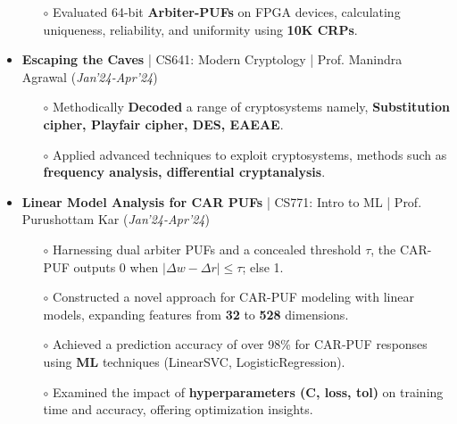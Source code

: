 \documentclass[10.8pt, a4paper]{extarticle}
\begin{document}
\begin{itemize}
\begin{itemize}
\item[$\circ$] Evaluated 64-bit \textbf{Arbiter-PUFs} on FPGA devices, calculating uniqueness, reliability, and uniformity using \textbf{10K CRPs}.\\[-0.6cm]


	\end{itemize}


 \item \textbf{Escaping the Caves} | CS641: Modern Cryptology | Prof. Manindra Agrawal \href{https://github.com/vishalsavarna/Escaping_the_Caves-CS641}{\faGithub{}} \hfill(\textit{Jan'24-Apr'24})
    \\[-0.6cm]
	\begin{itemize}
	      \item [$\circ$] Methodically \textbf {Decoded} a range of cryptosystems namely, \textbf {Substitution cipher, Playfair cipher, DES, EAEAE}.\\[-0.6cm]
	      
	      \item [$\circ$] Applied advanced techniques to exploit cryptosystems, methods such as\textbf { frequency analysis, differential cryptanalysis}.\\[-0.6cm]
	\end{itemize}


   \item \textbf{Linear Model Analysis for CAR PUFs} | CS771: Intro to ML | Prof.  Purushottam Kar \href{https://github.com/vishalsavarna/Linear_Model_Analysis_for_CAR_PUF-CS771}{\faGithub{}}  \hfill(\textit{Jan'24-Apr'24})
	\\[-0.6cm]
	\begin{itemize}
 \item[$\circ$] Harnessing dual arbiter PUFs and a concealed threshold $\tau$, the CAR-PUF outputs 0 when $|\Delta w - \Delta r| \leq \tau$; else 1.\\[-0.6cm]
 
\item[$\circ$] Constructed a novel approach for CAR-PUF modeling with linear models, expanding features from \textbf{32} to \textbf{528} dimensions.\\[-0.6cm]
 
\item[$\circ$]  Achieved a prediction accuracy of over 98\% for CAR-PUF responses using \textbf{ML} techniques (LinearSVC, LogisticRegression).\\[-0.6cm]
 
\item[$\circ$] Examined the impact of \textbf{hyperparameters (C, loss, tol)} on training time and accuracy, offering optimization insights.\\[-0.6cm]



	\end{itemize}

 

 \medskip

\end{itemize}
\vspace{-1mm}
\end{document}
